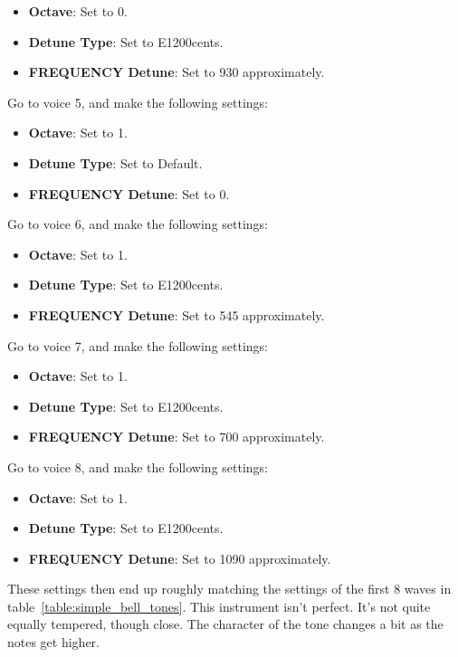 \begin{enumber}
\begin{itemize}
            \item \textbf{Octave}: Set to 0.
            \item \textbf{Detune Type}: Set to E1200cents.
            \item \textbf{FREQUENCY Detune}: Set to 930 approximately.
         \end{itemize}
      \item Go to voice 5, and make the following settings:
         \begin{itemize}
            \item \textbf{Octave}: Set to 1.
            \item \textbf{Detune Type}: Set to Default.
            \item \textbf{FREQUENCY Detune}: Set to 0.
         \end{itemize}
      \item Go to voice 6, and make the following settings:
         \begin{itemize}
            \item \textbf{Octave}: Set to 1.
            \item \textbf{Detune Type}: Set to E1200cents.
            \item \textbf{FREQUENCY Detune}: Set to 545 approximately.
         \end{itemize}
      \item Go to voice 7, and make the following settings:
         \begin{itemize}
            \item \textbf{Octave}: Set to 1.
            \item \textbf{Detune Type}: Set to E1200cents.
            \item \textbf{FREQUENCY Detune}: Set to 700 approximately.
         \end{itemize}
      \item Go to voice 8, and make the following settings:
         \begin{itemize}
            \item \textbf{Octave}: Set to 1.
            \item \textbf{Detune Type}: Set to E1200cents.
            \item \textbf{FREQUENCY Detune}: Set to 1090 approximately.
         \end{itemize}
   \end{enumber}

   These settings then end up roughly matching the settings of the first 8
   waves in table~\ref{table:simple_bell_tones}.
   This instrument isn't perfect.  It's not quite equally tempered, though
   close.  The character of the tone changes a bit as the notes get higher.


